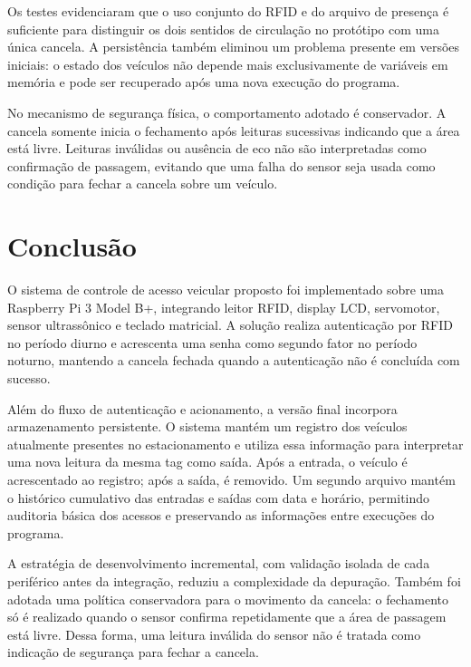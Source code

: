 \documentclass[11pt,a4paper]{article}
\begin{document}
Os testes evidenciaram que o uso conjunto do RFID e do arquivo de presença é
suficiente para distinguir os dois sentidos de circulação no protótipo com uma
única cancela. A persistência também eliminou um problema presente em versões
iniciais: o estado dos veículos não depende mais exclusivamente de variáveis em
memória e pode ser recuperado após uma nova execução do programa.

No mecanismo de segurança física, o comportamento adotado é conservador. A
cancela somente inicia o fechamento após leituras sucessivas indicando que a
área está livre. Leituras inválidas ou ausência de eco não são interpretadas
como confirmação de passagem, evitando que uma falha do sensor seja usada como
condição para fechar a cancela sobre um veículo.

\section{Conclusão}

O sistema de controle de acesso veicular proposto foi implementado sobre uma
Raspberry Pi 3 Model B+, integrando leitor RFID, display LCD, servomotor, sensor
ultrassônico e teclado matricial. A solução realiza autenticação por RFID no
período diurno e acrescenta uma senha como segundo fator no período noturno,
mantendo a cancela fechada quando a autenticação não é concluída com sucesso.

Além do fluxo de autenticação e acionamento, a versão final incorpora
armazenamento persistente. O sistema mantém um registro dos veículos atualmente
presentes no estacionamento e utiliza essa informação para interpretar uma nova
leitura da mesma tag como saída. Após a entrada, o veículo é acrescentado ao
registro; após a saída, é removido. Um segundo arquivo mantém o histórico
cumulativo das entradas e saídas com data e horário, permitindo auditoria básica
dos acessos e preservando as informações entre execuções do programa.

A estratégia de desenvolvimento incremental, com validação isolada de cada
periférico antes da integração, reduziu a complexidade da depuração. Também foi
adotada uma política conservadora para o movimento da cancela: o fechamento só
é realizado quando o sensor confirma repetidamente que a área de passagem está
livre. Dessa forma, uma leitura inválida do sensor não é tratada como indicação
de segurança para fechar a cancela.
\end{document}
